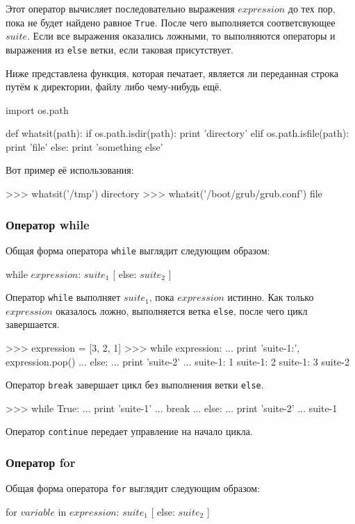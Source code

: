 Этот оператор вычисляет последовательно выражения $expression$ до тех пор, пока не будет найдено равное \lstinline{True}. После чего выполняется соответсвующее $suite$. Если все выражения оказались ложными, то выполняются операторы и выражения из \lstinline{else} ветки, если таковая присутствует.

Ниже представлена функция, которая печатает, является ли переданная строка путём к директории, файлу либо чему-нибудь ещё.
\begin{pylst}{}{}
import os.path

def whatsit(path):
    if os.path.isdir(path):
        print 'directory'
    elif os.path.isfile(path):
        print 'file'
    else:
        print 'something else'
\end{pylst}

Вот пример её использования:
\begin{pylst}{}{}
>>> whatsit('/tmp')
directory
>>> whatsit('/boot/grub/grub.conf')
file
\end{pylst}

\subsubsection{Оператор while}
Общая форма оператора \lstinline{while} выглядит следующим образом:
\begin{pylst}{}{}
while $expression$: $suite_1$
[ else: $suite_2$ ]
\end{pylst}

Оператор \lstinline{while} выполняет $suite_1$, пока $expression$ истинно. Как только $expression$ оказалось ложно, выполняется ветка \lstinline{else}, после чего цикл завершается.
\begin{pylst}{}{}
>>> expression = [3, 2, 1]
>>> while expression:
...     print 'suite-1:', expression.pop()
... else:
...     print 'suite-2'
...
suite-1: 1
suite-1: 2
suite-1: 3
suite-2
\end{pylst}

Оператор \lstinline{break} завершает цикл без выполнения ветки \lstinline{else}.
\begin{pylst}{}{}
>>> while True:
...     print 'suite-1'
...     break
... else:
...     print 'suite-2'
...
suite-1
\end{pylst}

Оператор \lstinline{continue} передает управление на начало цикла.

\subsubsection{Оператор for}
Общая форма оператора \lstinline{for} выглядит следующим образом:
\begin{pylst}{}{}
for $variable$ in $expression$: $suite_1$
[ else: $suite_2$ ]
\end{pylst}

